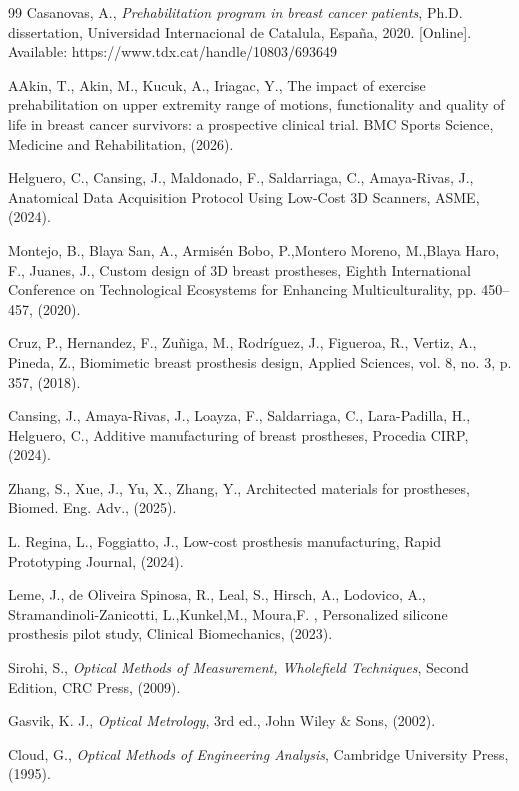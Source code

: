 \documentclass{article}
\begin{document}
\begin{thebibliography}{99}
 Casanovas, A., \textit{Prehabilitation program in breast cancer patients}, Ph.D. dissertation, Universidad Internacional de Catalula, España, 2020. [Online]. Available: https://www.tdx.cat/handle/10803/693649

 AAkin, T., Akin, M., Kucuk, A., Iriagac, Y., The impact of exercise prehabilitation on upper extremity range of motions, functionality and quality of life in breast cancer survivors: a prospective clinical trial. BMC Sports Science, Medicine and Rehabilitation, (2026).

 Helguero, C., Cansing, J., Maldonado, F., Saldarriaga, C., Amaya-Rivas, J., Anatomical Data Acquisition Protocol Using Low-Cost 3D Scanners, ASME, (2024).

 Montejo, B., Blaya San, A., Armisén Bobo, P.,Montero Moreno, M.,Blaya Haro, F., Juanes, J., Custom design of 3D breast prostheses, Eighth International Conference on Technological
Ecosystems for Enhancing Multiculturality, pp. 450–457, (2020).

 Cruz, P., Hernandez, F., Zuñiga, M., Rodríguez, J., Figueroa, R., Vertiz, A., Pineda, Z., Biomimetic breast prosthesis design, Applied Sciences, vol. 8, no. 3, p. 357,  (2018).

 Cansing, J., Amaya-Rivas, J., Loayza, F., Saldarriaga, C., Lara-Padilla, H., Helguero, C., Additive manufacturing of breast prostheses, Procedia CIRP, (2024).

 Zhang, S., Xue, J., Yu, X., Zhang, Y., Architected materials for prostheses, Biomed. Eng. Adv., (2025).

 L. Regina, L., Foggiatto, J., Low-cost prosthesis manufacturing, Rapid Prototyping Journal, (2024).

 Leme, J., de Oliveira Spinosa, R., Leal, S., Hirsch, A., Lodovico, A., Stramandinoli-Zanicotti, L.,Kunkel,M., Moura,F. , Personalized silicone prosthesis pilot study, Clinical Biomechanics, (2023).
				
			
			
	 Sirohi, S., \emph{Optical Methods of Measurement, Wholefield Techniques}, Second Edition, CRC Press, (2009).
		
		 Gasvik, K. J., \emph{Optical Metrology}, 3rd ed., John Wiley \& Sons, (2002).
		
		 Cloud, G., \emph{Optical Methods of Engineering Analysis}, Cambridge University Press, (1995). 
		

\end{thebibliography}
\end{document}
